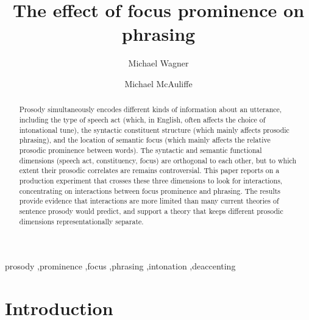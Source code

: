 \documentclass[preprint,review,12pt,authoryear,times]{elsarticle}
\begin{document}
\begin{frontmatter}


\title{The effect of focus prominence on phrasing}


\author{Michael Wagner}
\author{Michael McAuliffe}



\address{Department of Linguistics, McGill University \\ 1085 Doctor Penfield Avenue, Montr\'eal, Qu\'ebec, H3A 1A7\\Canada}

\begin{abstract}
Prosody simultaneously encodes different kinds of information about an utterance, including the type of speech act (which, in English, often affects the choice of intonational tune),  the syntactic constituent structure (which mainly affects prosodic phrasing), and the location of semantic focus (which mainly affects the relative prosodic prominence between words). The syntactic and semantic functional dimensions (speech act, constituency, focus) are orthogonal to each other, but to which extent their prosodic correlates are remains controversial. This paper reports on a production experiment that crosses these three dimensions to look for interactions, concentrating on interactions between focus prominence and phrasing. The results provide evidence that interactions are more limited than many current theories of sentence prosody would predict, and support a theory that keeps different prosodic dimensions representationally separate.
\end{abstract}

\begin{keyword}

prosody \sep prominence \sep focus \sep phrasing \sep intonation \sep deaccenting

\end{keyword}

\end{frontmatter}

\section{Introduction}
 
\end{document}

